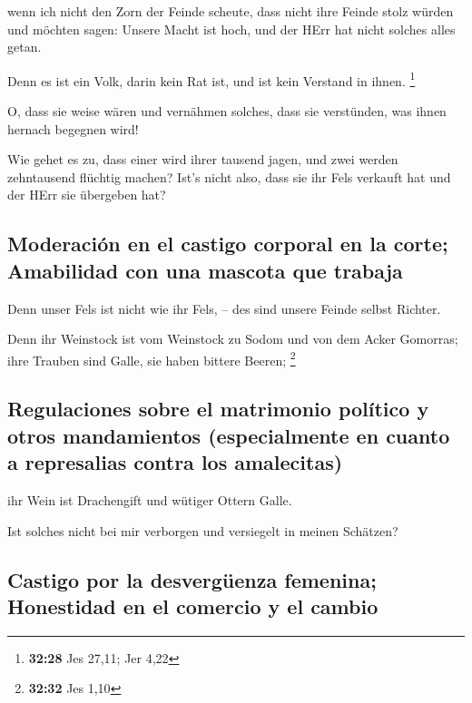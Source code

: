 wenn ich nicht den Zorn der Feinde scheute, dass nicht
ihre Feinde stolz würden und möchten sagen: Unsere Macht ist hoch, und
der HErr hat nicht solches alles getan.

 Denn es ist ein Volk, darin kein Rat ist, und ist kein
Verstand in ihnen. \footnote{\textbf{32:28} Jes 27,11; Jer 4,22}

 O, dass sie weise wären und vernähmen solches, dass sie
verstünden, was ihnen hernach begegnen wird!

 Wie gehet es zu, dass einer wird ihrer tausend jagen,
und zwei werden zehntausend flüchtig machen? Ist's nicht also, dass sie
ihr Fels verkauft hat und der HErr sie übergeben hat?

\hypertarget{moderaciuxf3n-en-el-castigo-corporal-en-la-corte-amabilidad-con-una-mascota-que-trabaja}{%
\subsection{Moderación en el castigo corporal en la corte; Amabilidad
con una mascota que
trabaja}\label{moderaciuxf3n-en-el-castigo-corporal-en-la-corte-amabilidad-con-una-mascota-que-trabaja}}

 Denn unser Fels ist nicht wie ihr Fels, -- des sind
unsere Feinde selbst Richter.

 Denn ihr Weinstock ist vom Weinstock zu Sodom und von
dem Acker Gomorras; ihre Trauben sind Galle, sie haben bittere Beeren;
\footnote{\textbf{32:32} Jes 1,10}

\hypertarget{regulaciones-sobre-el-matrimonio-poluxedtico-y-otros-mandamientos-especialmente-en-cuanto-a-represalias-contra-los-amalecitas}{%
\subsection{Regulaciones sobre el matrimonio político y otros
mandamientos (especialmente en cuanto a represalias contra los
amalecitas)}\label{regulaciones-sobre-el-matrimonio-poluxedtico-y-otros-mandamientos-especialmente-en-cuanto-a-represalias-contra-los-amalecitas}}

 ihr Wein ist Drachengift und wütiger Ottern Galle.

 Ist solches nicht bei mir verborgen und versiegelt in
meinen Schätzen?

\hypertarget{castigo-por-la-desverguxfcenza-femenina-honestidad-en-el-comercio-y-el-cambio}{%
\subsection{Castigo por la desvergüenza femenina; Honestidad en el
comercio y el
cambio}\label{castigo-por-la-desverguxfcenza-femenina-honestidad-en-el-comercio-y-el-cambio}}

